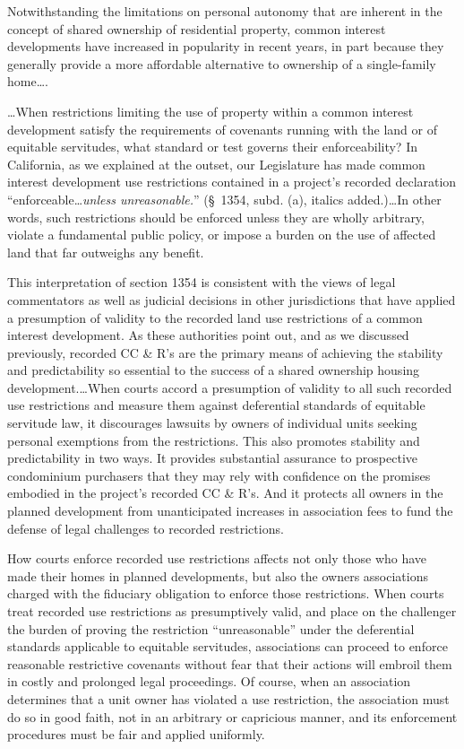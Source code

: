 Notwithstanding the limitations on personal autonomy that are inherent in the
concept of shared ownership of residential property, common interest
developments have increased in popularity in recent years, in part because they
generally provide a more affordable alternative to ownership of a single-family
home\ldots .

\ldots When restrictions limiting the use of property within a common interest
development satisfy the requirements of covenants running with the land or of
equitable servitudes, what standard or test governs their enforceability? In
California, as we explained at the outset, our Legislature has made common
interest development use restrictions contained in a project's recorded
declaration ``enforceable\ldots \textit{unless unreasonable.}'' (\S~1354, subd.
(a), italics added.)\ldots In other words, such restrictions should be enforced
unless they are wholly arbitrary, violate a fundamental public policy, or impose
a burden on the use of affected land that far outweighs any benefit.

This interpretation of section 1354 is consistent with the views of legal
commentators as well as judicial decisions in other jurisdictions that have
applied a presumption of validity to the recorded land use restrictions of a
common interest development. As these authorities point out, and as we discussed
previously, recorded CC \& R's are the primary means of achieving the stability
and predictability so essential to the success of a shared ownership housing
development.\ldots When courts accord a presumption of validity to all such
recorded use restrictions and measure them against deferential standards of
equitable servitude law, it discourages lawsuits by owners of individual units
seeking personal exemptions from the restrictions. This also promotes stability
and predictability in two ways. It provides substantial assurance to prospective
condominium purchasers that they may rely with confidence on the promises
embodied in the project's recorded CC \& R's. And it protects all owners in the
planned development from unanticipated increases in association fees to fund the
defense of legal challenges to recorded restrictions.

How courts enforce recorded use restrictions affects not only those who have
made their homes in planned developments, but also the owners associations
charged with the fiduciary obligation to enforce those restrictions. When courts
treat recorded use restrictions as presumptively valid, and place on the
challenger the burden of proving the restriction ``unreasonable'' under the
deferential standards applicable to equitable servitudes, associations can
proceed to enforce reasonable restrictive covenants without fear that their
actions will embroil them in costly and prolonged legal proceedings. Of course,
when an association determines that a unit owner has violated a use restriction,
the association must do so in good faith, not in an arbitrary or capricious
manner, and its enforcement procedures must be fair and applied uniformly.

